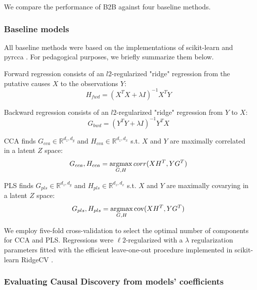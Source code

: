 We compare the performance of B2B against four baseline methods.
%

\subsubsection{Baseline models}

All baseline methods were based on the implementations of scikit-learn \citep{sklearn} and pyrcca
\citep{bilenko2016pyrcca}. For pedagogical purposes, we briefly summarize them below.

Forward regression consists of an $l2$-regularized "ridge" regression from the
putative causes $X$ to the observations $Y$: \begin{equation} H_{fwd} = (X^T X
+\lambda I)^{-1} X^T Y \end{equation}

Backward regression consists of an $l2$-regularized "ridge" regression from $Y$
to $X$: \begin{equation} G_{bwd} = (Y^T Y +\lambda I)^{-1} Y^T X \end{equation}

CCA finds $G_{cca}\in\mathbb{R}^{d_z, d_y}$ and $H_{cca}\in\mathbb{R}^{d_z, d_x}$
s.t.
$X$ and $Y$ are maximally correlated in a latent $Z$ space:
\begin{equation} G_{cca},H_{cca} = \operatorname*{argmax}_{G,H} corr(XH^T, YG^T) \end{equation}

PLS finds $G_{pls}\in\mathbb{R}^{d_z, d_y}$ and $H_{pls}\in\mathbb{R}^{d_z, d_x}$
s.t.
$X$ and $Y$ are maximally covarying in a latent $Z$ space:
\begin{equation} G_{pls},H_{pls} = \operatorname*{argmax}_{G,H} \text{cov}(XH^T, YG^T) \end{equation}

We employ five-fold cross-validation to select the optimal number of components
for CCA and PLS. Regressions were $\ell2$-regularized with a $\lambda$ regularization
parameters fitted with the efficient leave-one-out procedure implemented in
scikit-learn RidgeCV \citep{sklearn}.

\subsubsection{Evaluating Causal Discovery from models' coefficients}

